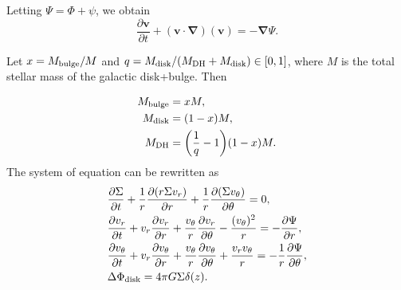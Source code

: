 \documentclass[11pt]{article}
\newcommand{\bv}{\boldsymbol{v}}
\newcommand{\bnab}{\boldsymbol{\nabla}}
\newcommand{\vr}{v_{r}}
\newcommand{\vt}{v_{\theta}}
\newcommand{\Phid}{\Phi_{\rm{disk}}}
\newcommand{\Mb}{M_{\rm{bulge}}}
\newcommand{\Md}{M_{\rm{disk}}}
\newcommand{\Mdh}{M_{\rm{DH}}}
\newcommand{\Msg}{M_{\rm{sg}}}
\begin{document}
 Letting $\Psi = \Phi + \psi$, we obtain
\begin{equation}
\frac{\partial \bv}{\partial t} + (\bv \cdot \bnab)(\bv) = - \bnab \Psi.
\end{equation}

Let $x=\Mb/M$ and $q=\Md/(\Mdh+\Md) \in [0,1]$, where $M$ is the total stellar mass of the galactic disk+bulge.   Then

\begin{align*}
\Mb &= x M,\\
\Md &= (1 - x)M  ,\\
\Mdh &= \bigg(\frac{1}{q}-1\bigg) (1-x) M.
\end{align*}
The system of equation can be rewritten as 
\begin{align}
&\frac{\partial \Sigma}{\partial t} + \frac{1}{r} \frac{\partial(r\Sigma \vr)}{\partial r} + \frac{1}{r} \frac{\partial(\Sigma \vt)}{\partial \theta} = 0 ,\\
&\frac{\partial \vr}{\partial t} + \vr \frac{\partial \vr}{\partial r} + \frac{\vt}{r} \frac{\partial \vr}{\partial \theta} - \frac{(\vt)^2}{r} = -\frac{\partial \Psi}{\partial r} ,\\
&\frac{\partial \vt}{\partial t} + \vr \frac{\partial \vt}{\partial r} + \frac{\vt}{r} \frac{\partial \vt}{\partial \theta} + \frac{\vr\vt}{r} = -\frac{1}{r}\frac{\partial \Psi}{\partial \theta} ,\\
& \Delta \Phid = 4\pi G \Sigma \delta (z).
\end{align}
\end{document}
